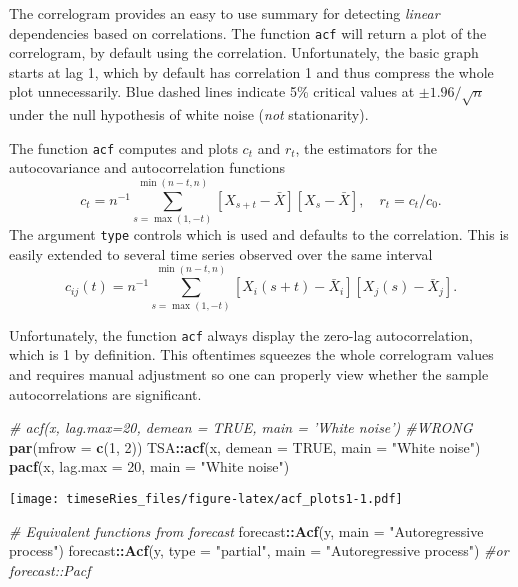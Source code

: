 \documentclass[]{book}
\newenvironment{Shaded}{\begin{snugshade}}{\end{snugshade}}
\newcommand{\KeywordTok}[1]{\textcolor[rgb]{0.13,0.29,0.53}{\textbf{#1}}}
\newcommand{\DataTypeTok}[1]{\textcolor[rgb]{0.13,0.29,0.53}{#1}}
\newcommand{\DecValTok}[1]{\textcolor[rgb]{0.00,0.00,0.81}{#1}}
\newcommand{\StringTok}[1]{\textcolor[rgb]{0.31,0.60,0.02}{#1}}
\newcommand{\CommentTok}[1]{\textcolor[rgb]{0.56,0.35,0.01}{\textit{#1}}}
\newcommand{\OtherTok}[1]{\textcolor[rgb]{0.56,0.35,0.01}{#1}}
\newcommand{\OperatorTok}[1]{\textcolor[rgb]{0.81,0.36,0.00}{\textbf{#1}}}
\newcommand{\NormalTok}[1]{#1}
\begin{document}
The correlogram provides an easy to use summary for detecting
\emph{linear} dependencies based on correlations. The function
\texttt{acf} will return a plot of the correlogram, by default using the
correlation. Unfortunately, the basic graph starts at lag 1, which by
default has correlation 1 and thus compress the whole plot
unnecessarily. Blue dashed lines indicate 5\% critical values at
\(\pm 1.96/\sqrt{n}\) under the null hypothesis of white noise
(\emph{not} stationarity).

The function \texttt{acf} computes and plots \(c_t\) and \(r_t\), the
estimators for the autocovariance and autocorrelation functions
\[c_t= n^{-1}\sum_{s=\max(1,-t)}^{\min(n-t,n)}[X_{s+t}-\bar X][X_s-\bar X], \quad r_t={c_t}/{c_0}.\]
The argument \texttt{type} controls which is used and defaults to the
correlation. This is easily extended to several time series observed
over the same interval
\[c_{ij}(t) = n^{-1}\sum_{s=\max(1,-t)}^{\min(n-t,n)}[X_i(s+t)-\bar X_i][X_j(s)-\bar X_j].\]

Unfortunately, the function \texttt{acf} always display the zero-lag
autocorrelation, which is 1 by definition. This oftentimes squeezes the
whole correlogram values and requires manual adjustment so one can
properly view whether the sample autocorrelations are significant.

\begin{Shaded}
\begin{Highlighting}[]
\CommentTok{# acf(x, lag.max=20, demean = TRUE, main = 'White noise') #WRONG}
\KeywordTok{par}\NormalTok{(}\DataTypeTok{mfrow =} \KeywordTok{c}\NormalTok{(}\DecValTok{1}\NormalTok{, }\DecValTok{2}\NormalTok{))}
\NormalTok{TSA}\OperatorTok{::}\KeywordTok{acf}\NormalTok{(x, }\DataTypeTok{demean =} \OtherTok{TRUE}\NormalTok{, }\DataTypeTok{main =} \StringTok{"White noise"}\NormalTok{)}
\KeywordTok{pacf}\NormalTok{(x, }\DataTypeTok{lag.max =} \DecValTok{20}\NormalTok{, }\DataTypeTok{main =} \StringTok{"White noise"}\NormalTok{)}
\end{Highlighting}
\end{Shaded}

\texttt{[image: timeseRies\_files/figure-latex/acf\_plots1-1.pdf]}

\begin{Shaded}
\begin{Highlighting}[]
\CommentTok{# Equivalent functions from forecast}
\NormalTok{forecast}\OperatorTok{::}\KeywordTok{Acf}\NormalTok{(y, }\DataTypeTok{main =} \StringTok{"Autoregressive process"}\NormalTok{)}
\NormalTok{forecast}\OperatorTok{::}\KeywordTok{Acf}\NormalTok{(y, }\DataTypeTok{type =} \StringTok{"partial"}\NormalTok{, }\DataTypeTok{main =} \StringTok{"Autoregressive process"}\NormalTok{)  }\CommentTok{#or forecast::Pacf}
\end{Highlighting}
\end{Shaded}
\end{document}
